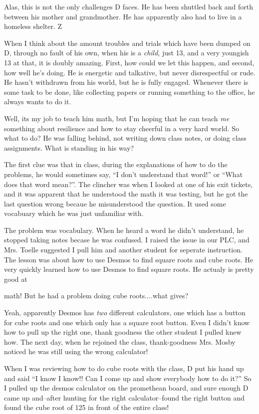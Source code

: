 \documentclass[11pt]{elegantbook}
\begin{document}
Alas, this is not the only challenges D faces.  He has been shuttled
back and forth between his mother and grandmother.  He has apparently
also had to live in a homeless shelter.  Z

When I think about the amount troubles and trials which have been
dumped on D, through no fault of his own, when his is a {\em child},
just 13, and a very youngish 13 at that, it is doubly amazing.  First,
how could we let this happen, and second, how well he's doing.  He is
energetic and talkative, but never disrespectful or rude.  He hasn't
withdrawn from his world, but he is fully engaged.  Whenever there is
some task to be done, like collecting papers or running something to
the office, he always wants to do it.

Well, its my job to teach him math, but I'm hoping that he can teach
{\em me} something about resilience and how to stay cheerful in a very
hard world.  So what to do?  He was falling behind, not writing down
class notes, or doing class assignments.  What is standing in his way?

The first clue was that in class, during the explanations of how to do
the problems, he would sometimes say, ``I don't understand that
word!'' or ``What does that word mean?''.  The clincher was when I
looked at one of his exit tickets, and it was apparent that he
understood the math it was testing, but he got the last question wrong
becaue he misunderstood the question.  It used some vocabuary which he
was just unfamiliar with.

The problem was vocabulary.  When he heard a word he didn't
understand, he stopped taking notes becase he was confused. I raised
the issue in our PLC, and Mrs. Toelle suggested I pull him and another
student for seperate instruction.  The lesson was about how to use
Desmos to find square roots and cube roots.  He very quickly learned
how to use Desmos to find square roots.  He actualy is pretty good at


math!  But he had a problem doing cube roots....what gives?

Yeah, apparently Desmos has {\em two} different calculators, one which
has a button for cube roots and one which only has a square root
button.  Even I didn't know how to pull up the right one, thank
goodness the other student I pulled knew how.  The next day, when he
rejoined the class, thank-goodness Mrs. Mosby noticed he was still
using the wrong calculator!

When I was reviewing how to do cube roots with the class, D put his
hand up and said ``I know I know!!  Can I come up and show everybody
how to do it?''  So I pulled up the desmos calculator on the
promethean board, and sure enough D came up and--after hunting for the
right calculator--found the right button and found the cube root of
125 in front of the entire class!
\end{document}
